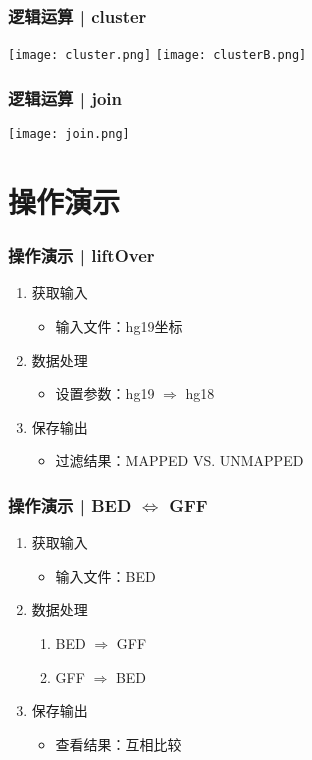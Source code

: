 \begin{frame}
	\frametitle{逻辑运算 | cluster}
		\begin{center}
			\texttt{[image: cluster.png]}
			\vspace{0.1cm}
			\texttt{[image: clusterB.png]}
		\end{center}
\end{frame}

\begin{frame}
	\frametitle{逻辑运算 | join}
		\begin{center}
			\texttt{[image: join.png]}
		\end{center}
\end{frame}

\section{操作演示}
\begin{frame}
	\frametitle{操作演示 | liftOver}
	\begin{enumerate}[<+-|alert@+>]
		\item 获取输入
			\begin{itemize}
				\item 输入文件：hg19坐标
			\end{itemize}
		\item 数据处理
			\begin{itemize}
				\item 设置参数：hg19 $\Rightarrow$ hg18
			\end{itemize}
		\item 保存输出
			\begin{itemize}
				\item 过滤结果：MAPPED VS. UNMAPPED
			\end{itemize}
	\end{enumerate}
\end{frame}

\begin{frame}
	\frametitle{操作演示 | BED $\Leftrightarrow$ GFF}
	\begin{enumerate}[<+-|alert@+>]
		\item 获取输入
			\begin{itemize}
				\item 输入文件：BED
			\end{itemize}
		\item 数据处理
			\begin{enumerate}
				\item BED $\Rightarrow$ GFF
				\item GFF $\Rightarrow$ BED
			\end{enumerate}
		\item 保存输出
			\begin{itemize}
				\item 查看结果：互相比较
			\end{itemize}
	\end{enumerate}
\end{frame}


